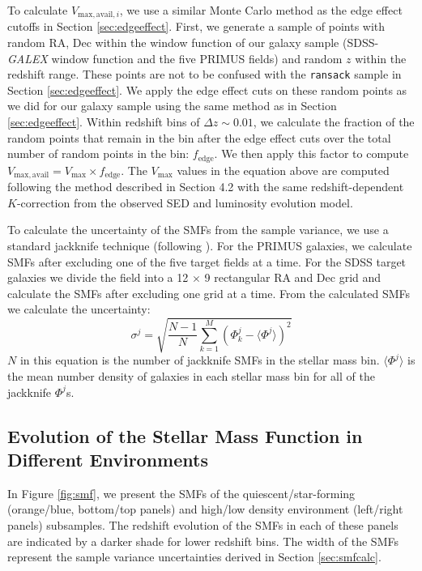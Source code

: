 To calculate $V_{\mathrm{max,avail},i}$, we use a similar Monte Carlo
method as the edge effect cutoffs in Section
\ref{sec:edgeeffect}. First, we generate a sample of points with
random RA, Dec within the window function of our galaxy sample
(SDSS-{\em GALEX} window function and the five PRIMUS fields) and
random $z$ within the redshift range. These points are not to be
confused with the \texttt{ransack} sample in Section
\ref{sec:edgeeffect}. We apply the edge effect cuts on these random
points as we did for our galaxy sample using the same method as in
Section \ref{sec:edgeeffect}. Within redshift bins of $\Delta z \sim
0.01$, we calculate the fraction of the random points that remain in
the bin after the edge effect cuts over the total number of random
points in the bin: $f_{\mathrm{edge}}$. We then apply this factor to
compute $V_{\mathrm{max,avail}} = V_{\mathrm{max}} \times f_{\mathrm{edge}}$. The
$V_{\mathrm{max}}$ values in the equation above are computed following the
method described in \cite{Moustakas:2013aa} Section 4.2 with the same
redshift-dependent $K$-correction from the observed SED and luminosity
evolution model.

To calculate the uncertainty of the SMFs from the sample variance, we use a standard jackknife technique (following \citealt{Moustakas:2013aa}). For the PRIMUS galaxies, we calculate SMFs after excluding one of the five target fields at a time. For the SDSS target galaxies we divide the field into a 12 $\times$ 9 rectangular RA and Dec grid and calculate the SMFs after excluding one grid at a time. From the calculated SMFs we calculate the uncertainty: 
\begin{equation}
\sigma^j = \sqrt{\frac{N-1}{N} \sum\limits_{k=1}^{M} (\Phi^j_k - \langle \Phi^j \rangle)^2}
\end{equation} 
$N$ in this equation is the number of jackknife SMFs in the stellar mass bin. $\langle \Phi^j \rangle$ is the mean number density of galaxies in each stellar mass bin for all of the jackknife $\Phi^j$s. 

\subsection{Evolution of the Stellar Mass Function in Different Environments} \label{sec:smfevol}
In Figure \ref{fig:smf}, we present the SMFs of the quiescent/star-forming (orange/blue, bottom/top panels) and high/low density environment (left/right panels) subsamples. The redshift evolution of the SMFs in each of these panels are indicated by a darker shade for lower redshift bins. The width of the SMFs represent the sample variance uncertainties derived in Section \ref{sec:smfcalc}.

